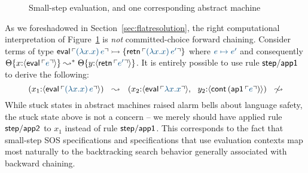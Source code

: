 \begin{figure}[tp]
\begin{minipage}[b]{0.9\linewidth}
\end{minipage}
\caption{Small-step evaluation, and one corresponding abstract machine}
\label{fig:cbv-sos}
\end{figure}



As we
foreshadowed in Section~\ref{sec:flatresolution}, the right
computational interpretation of Figure~\ref{fig:cbv-sos} is {\it not}
committed-choice forward chaining. Consider terms of type ${\sf
  eval}\,\interp{(\lambda x.x)\,e} \lefti \{ {\sf
  retn}\,\interp{(\lambda x.x)\,e'} \}$ where $\obj{e \mapsto e'}$ and
consequently $\tackon{\Theta}{x{:}\susp{{\sf eval}\,\interp{e}}}
\leadsto^* \tackon{\Theta}{y{:}\susp{{\sf retn}\,\interp{e'}}}$.
It is entirely possible to use rule ${\sf step/app1}$ to
derive the following:
\[
  (x_1{:}\susp{{\sf eval}\,\interp{(\lambda x.x)\,e}})
   ~~ \leadsto ~~
  (x_2{:}\susp{{\sf eval}\,\interp{\lambda x.x}}, ~~
  y_2{:}\susp{{\sf cont}\,({\sf ap1}\,\interp{e})})
   ~~ \not\leadsto
\]
While stuck states in abstract machines raised alarm bells about
language safety, the stuck state above is not a concern -- we merely
should have applied rule ${\sf step/app2}$ to $x_1$ instead
of rule ${\sf step/app1}$. This
corresponds to the fact that small-step SOS specifications and
specifications that use evaluation contexts 
map most naturally to the backtracking
search behavior generally associated with backward chaining. 



